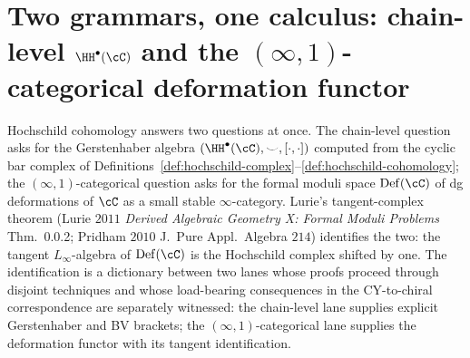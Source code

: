 \section{Two grammars, one calculus: chain-level \texorpdfstring{$\HH^\bullet(\cC)$}{HH-.(C)} and the \texorpdfstring{$(\infty,1)$}{(inf,1)}-categorical deformation functor}
\label{sec:two-grammars-hh-def}

Hochschild cohomology answers two questions at once. The chain-level
question asks for the Gerstenhaber algebra $(\HH^\bullet(\cC), \smile, [\cdot,\cdot])$
computed from the cyclic bar complex of Definitions~\ref{def:hochschild-complex}--\ref{def:hochschild-cohomology};
the $(\infty,1)$-categorical question asks for the formal moduli space
$\mathrm{Def}(\cC)$ of dg deformations of $\cC$ as a small stable
$\infty$-category. Lurie's tangent-complex theorem (Lurie $2011$
\emph{Derived Algebraic Geometry X: Formal Moduli Problems} Thm.~0.0.2;
Pridham $2010$ J.\ Pure Appl.\ Algebra $214$) identifies the two: the
tangent $L_\infty$-algebra of $\mathrm{Def}(\cC)$ is the Hochschild
complex shifted by one. The identification is a dictionary between two lanes whose proofs
proceed through disjoint techniques and whose load-bearing consequences
in the CY-to-chiral correspondence are separately witnessed: the chain-level
lane supplies explicit Gerstenhaber and BV brackets; the
$(\infty, 1)$-categorical lane supplies the deformation functor with
its tangent identification.


